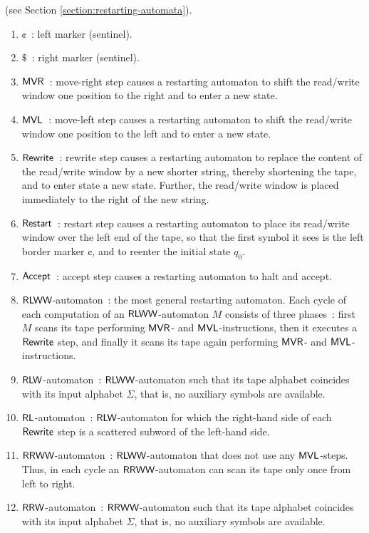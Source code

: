  (see Section \ref{section:restarting-automata}).

\begin{enumerate}[]
\item $\cent$\ : left marker (sentinel).
\item $\$$\ : right marker (sentinel).
\item $\textup{\sf MVR}$\ : move-right step causes a restarting automaton to shift the read/write window one position to the right and to enter a new state.
\item $\textup{\sf MVL}$\ : move-left step causes a restarting automaton to shift the read/write window one position to the left and to enter a new state.
\item $\textup{\sf Rewrite}$\ : rewrite step causes a restarting automaton to replace the content of the read/write window by a new shorter string, thereby shortening the tape, and to enter state a new state. Further, the read/write window is placed immediately to the right of the new string.
\item $\textup{\sf Restart}$\ : restart step causes a restarting automaton to place its read/write window over the left end of the tape, so that the first symbol it sees is the left border marker $\cent$, and to reenter the initial state $q_0$.
\item $\textup{\sf Accept}$\ : accept step causes a restarting automaton to halt and accept.
\item $\textup{\sf RLWW}$-automaton\ : the most general restarting automaton. Each cycle of each computation of an $\textup{\sf RLWW}$-automaton $M$ consists of three phases\ : first $M$ scans its tape performing $\textup{\sf MVR}$- and $\textup{\sf MVL}$-instructions, then it executes a $\textup{\sf Rewrite}$ step, and finally it scans its tape again performing $\textup{\sf MVR}$- and $\textup{\sf MVL}$-instructions.
\item $\textup{\sf RLW}$-automaton\ : $\textup{\sf RLWW}$-automaton such that its tape alphabet coincides with its input alphabet $\Sigma$, that is, no auxiliary symbols are available.
\item $\textup{\sf RL}$-automaton\ : $\textup{\sf RLW}$-automaton for which the right-hand side of each $\textup{\sf Rewrite}$ step is a scattered subword of the left-hand side.
\item $\textup{\sf RRWW}$-automaton\ : $\textup{\sf RLWW}$-automaton that does not use any $\textup{\sf MVL}$-steps. Thus, in each cycle an $\textup{\sf RRWW}$-automaton can scan its tape only once from left to right.
\item $\textup{\sf RRW}$-automaton\ : $\textup{\sf RRWW}$-automaton such that its tape alphabet coincides with its input alphabet $\Sigma$, that is, no auxiliary symbols are available.

\end{enumerate}
